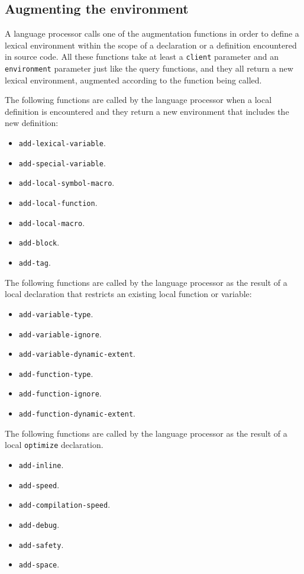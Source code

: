 \subsection{Augmenting the environment}

A language processor calls one of the augmentation functions in order
to define a lexical environment within the scope of a declaration or a
definition encountered in source code.  All these functions take at
least a \texttt{client} parameter and an \texttt{environment}
parameter just like the query functions, and they all return a new
lexical environment, augmented according to the function being called.

The following functions are called by the language processor when a
local definition is encountered and they return a new environment that
includes the new definition:

\begin{itemize}
\item \texttt{add-lexical-variable}.
\item \texttt{add-special-variable}.
\item \texttt{add-local-symbol-macro}.
\item \texttt{add-local-function}.
\item \texttt{add-local-macro}.
\item \texttt{add-block}.
\item \texttt{add-tag}.
\end{itemize}

The following functions are called by the language processor as the
result of a local declaration that restricts an existing local
function or variable:

\begin{itemize}
\item \texttt{add-variable-type}.
\item \texttt{add-variable-ignore}.
\item \texttt{add-variable-dynamic-extent}.
\item \texttt{add-function-type}.
\item \texttt{add-function-ignore}.
\item \texttt{add-function-dynamic-extent}.
\end{itemize}

The following functions are called by the language processor as the
result of a local \texttt{optimize} declaration.

\begin{itemize}
\item \texttt{add-inline}.
\item \texttt{add-speed}.
\item \texttt{add-compilation-speed}.
\item \texttt{add-debug}.
\item \texttt{add-safety}.
\item \texttt{add-space}.
\end{itemize}

